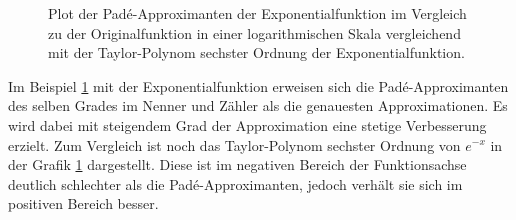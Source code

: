 \begin{figure}
\centering
{}
\caption{Plot der Padé-Approximanten der Exponentialfunktion
im Vergleich zu der Originalfunktion in einer logarithmischen
Skala vergleichend mit der Taylor-Polynom sechster Ordnung
der Exponentialfunktion.
\label{pade:totzeitexp}}
\end{figure}

Im Beispiel \ref{pade:totzeitexp} mit der Exponentialfunktion erweisen sich die Padé-Approximanten des selben Grades im Nenner und Zähler als die genauesten Approximationen.
Es wird dabei mit steigendem Grad der Approximation eine stetige Verbesserung erzielt.
Zum Vergleich ist noch das Taylor-Polynom sechster Ordnung von $e^{-x}$
in der Grafik \ref{pade:totzeitexp} dargestellt. 
Diese ist im negativen Bereich der Funktionsachse deutlich schlechter als die Padé-Approximanten, jedoch verhält sie sich im positiven Bereich besser.

